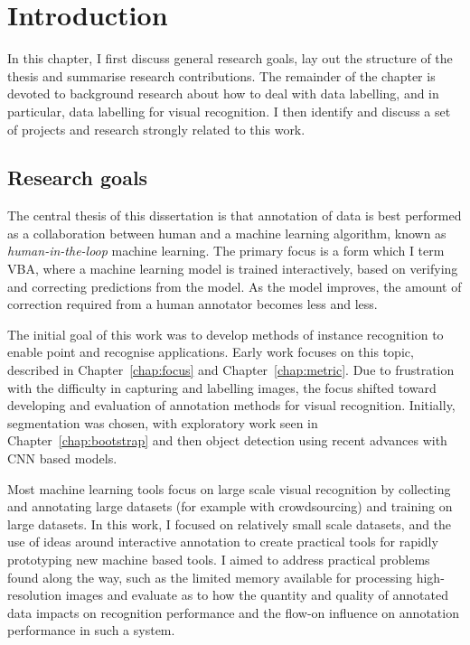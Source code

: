 \chapter{Introduction}
\label{chap:introduction}

In this chapter, I first discuss general research goals, lay out the structure of the thesis and summarise research contributions. The remainder of the chapter is devoted to background research about how to deal with data labelling, and in particular, data labelling for visual recognition. I then identify and discuss a set of projects and research strongly related to this work. 


\section{Research goals}
\label{sec:research_goals}

The central thesis of this dissertation is that annotation of data is best performed as a collaboration between human and a machine learning algorithm, known as \emph{human-in-the-loop} machine learning. The primary focus is a form which I term \gls{VBA}, where a machine learning model is trained interactively, based on verifying and correcting predictions from the model. As the model improves, the amount of correction required from a human annotator becomes less and less. 

The initial goal of this work was to develop methods of instance recognition to enable point and recognise applications. Early work focuses on this topic, described in Chapter~\ref{chap:focus} and Chapter~\ref{chap:metric}. Due to frustration with the difficulty in capturing and labelling images, the focus shifted toward developing and evaluation of annotation methods for visual recognition.  Initially, segmentation was chosen, with exploratory work seen in Chapter~\ref{chap:bootstrap} and then object detection using recent advances with \gls{CNN} based models.

Most machine learning tools focus on large scale visual recognition by collecting and annotating large datasets (for example with crowdsourcing) and training on large datasets. In this work, I focused on relatively small scale datasets, and the use of ideas around interactive annotation to create practical tools for rapidly prototyping new machine based tools. I aimed to address practical problems found along the way, such as the limited memory available for processing high-resolution images and evaluate as to how the quantity and quality of annotated data impacts on recognition performance and the flow-on influence on annotation performance in such a system.

